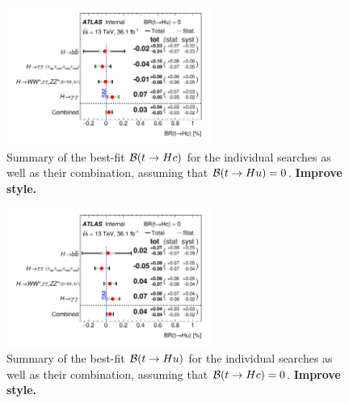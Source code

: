 \begin{figure}[t!]
\begin{center}
\includegraphics[width=0.6\textwidth]{figures/Combo/POI_tch.pdf}
\caption{\small {Summary of the best-fit $\mathcal{B}(t\to Hc)$ for the individual searches as well as their combination,
assuming that $\mathcal{B}(t\to Hu)=0$. \textbf{Improve style.}}}
\label{fig:summary_printnum_hc} 
\end{center}
\end{figure}
\begin{figure}[h!]
\begin{center}
\includegraphics[width=0.6\textwidth]{figures/Combo/POI_tuh.pdf}
\caption{\small {Summary of the best-fit $\mathcal{B}(t\to Hu)$ for the individual searches as well as their combination,
assuming that $\mathcal{B}(t\to Hc)=0$. \textbf{Improve style.}}}
\label{fig:summary_printnum_hu} 
\end{center}
\end{figure}

